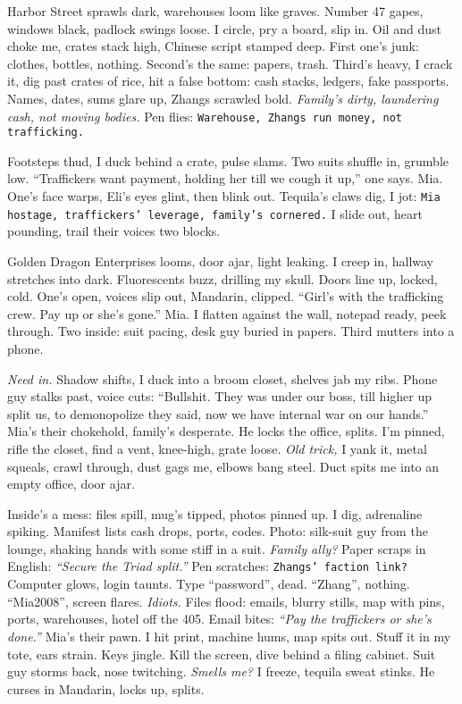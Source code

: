 \documentclass[12pt,oneside]{book} %
\newcommand{\note}[1]{\texttt{#1}}
\begin{document}
Harbor Street sprawls dark, warehouses loom like graves. Number 47 gapes, windows black, padlock swings loose. I circle, pry a board, slip in. Oil and dust choke me, crates stack high, Chinese script stamped deep. First one’s junk: clothes, bottles, nothing. Second’s the same: papers, trash. Third’s heavy, I crack it, dig past crates of rice, hit a false bottom: cash stacks, ledgers, fake passports. Names, dates, sums glare up, Zhangs scrawled bold. \textit{Family’s dirty, laundering cash, not moving bodies.} Pen flies: \note{Warehouse, Zhangs run money, not trafficking.}

Footsteps thud, I duck behind a crate, pulse slams. Two suits shuffle in, grumble low. “Traffickers want payment, holding her till we cough it up,” one says. Mia. One’s face warps, \textnormal{Eli}’s eyes glint, then blink out. Tequila’s claws dig, I jot: \note{Mia hostage, traffickers’ leverage, family’s cornered.} I slide out, heart pounding, trail their voices two blocks.

Golden Dragon Enterprises looms, door ajar, light leaking. I creep in, hallway stretches into dark. Fluorescents buzz, drilling my skull. Doors line up, locked, cold. One’s open, voices slip out, Mandarin, clipped. “Girl’s with the trafficking crew. Pay up or she’s gone.” Mia. I flatten against the wall, notepad ready, peek through. Two inside: suit pacing, desk guy buried in papers. Third mutters into a phone.

\textit{Need in.} Shadow shifts, I duck into a broom closet, shelves jab my ribs. Phone guy stalks past, voice cuts: “Bullshit. They was under our boss, till higher up split us, to demonopolize they said, now we have internal war on our hands.” Mia’s their chokehold, family’s desperate. He locks the office, splits. I’m pinned, rifle the closet, find a vent, knee-high, grate loose. \textit{Old trick,} I yank it, metal squeals, crawl through, dust gags me, elbows bang steel. Duct spits me into an empty office, door ajar.

Inside’s a mess: files spill, mug’s tipped, photos pinned up. I dig, adrenaline spiking. Manifest lists cash drops, ports, codes. Photo: silk-suit guy from the lounge, shaking hands with some stiff in a suit. \textit{Family ally?} Paper scraps in English: \textit{“Secure the Triad split.”} Pen scratches: \note{Zhangs’ faction link?} Computer glows, login taunts. Type “password”, dead. “Zhang”, nothing. “Mia2008”, screen flares. \textit{Idiots.} Files flood: emails, blurry stills, map with pins, ports, warehouses, hotel off the 405. Email bites: \textit{“Pay the traffickers or she’s done.”} Mia’s their pawn. I hit print, machine hums, map spits out. Stuff it in my tote, ears strain. Keys jingle. Kill the screen, dive behind a filing cabinet. Suit guy storms back, nose twitching. \textit{Smells me?} I freeze, tequila sweat stinks. He curses in Mandarin, locks up, splits.
\end{document}
